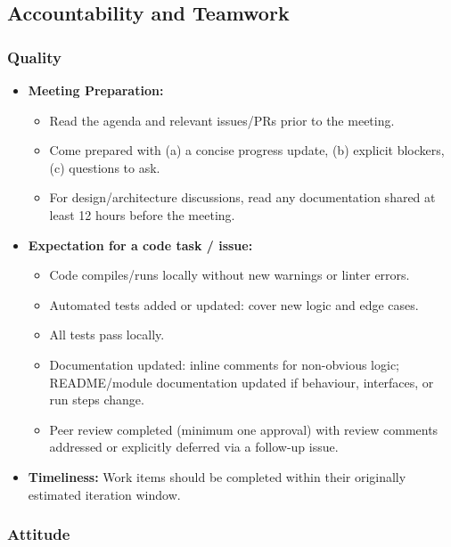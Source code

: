 \documentclass{article}
\begin{document}
\subsection*{Accountability and Teamwork}

\subsubsection*{Quality} 

\begin{itemize}
  \item \textbf{Meeting Preparation:}
  \begin{itemize}
    \item Read the agenda and relevant issues/PRs prior to the meeting.
    \item Come prepared with (a) a concise progress update, (b) explicit blockers, (c) questions to ask.
  \item For design/architecture discussions, read any documentation shared at least 12 hours before the meeting.
  \end{itemize}
  \item \textbf{Expectation for a code task / issue:}
  \begin{itemize}
  \item Code compiles/runs locally without new warnings or linter errors.
  \item Automated tests added or updated: cover new logic and edge cases.
    \item All tests pass locally.
  \item Documentation updated: inline comments for non-obvious logic; README/module documentation updated if behaviour, interfaces, or run steps change.
    \item Peer review completed (minimum one approval) with review comments addressed or explicitly deferred via a follow-up issue.
  \end{itemize}
  \item \textbf{Timeliness:} Work items should be completed within their originally estimated iteration window.
\end{itemize}

\subsubsection*{Attitude}
\end{document}
